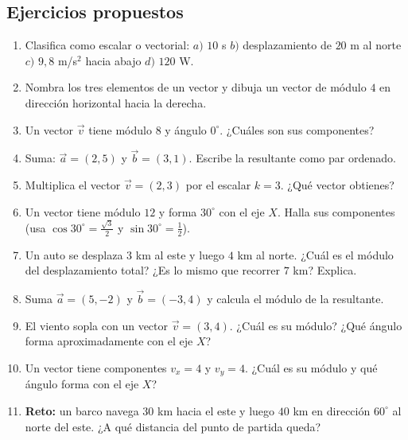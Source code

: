 \documentclass[12pt, letterpaper]{article}
\providecommand{\sen}{\sin}
\begin{document}
\subsection{Ejercicios propuestos}

\begin{enumerate}[leftmargin=*, resume]
  \item \facil{} Clasifica como escalar o vectorial: $a)$ $10$ s \quad $b)$ desplazamiento de $20$ m al norte \quad $c)$ $9{,}8$ m/s$^2$ hacia abajo \quad $d)$ $120$ W.

  \item \facil{} Nombra los tres elementos de un vector y dibuja un vector de módulo $4$ en dirección horizontal hacia la derecha.

  \item \facil{} Un vector $\vec{v}$ tiene módulo $8$ y ángulo $0^{\circ}$. ¿Cuáles son sus componentes?

  \item \facil{} Suma: $\vec{a} = (2, 5)$ y $\vec{b} = (3, 1)$. Escribe la resultante como par ordenado.

  \item \facil{} Multiplica el vector $\vec{v} = (2, 3)$ por el escalar $k = 3$. ¿Qué vector obtienes?

  \item \medio{} Un vector tiene módulo $12$ y forma $30^{\circ}$ con el eje $X$. Halla sus componentes (usa $\cos 30^{\circ} = \tfrac{\sqrt{3}}{2}$ y $\sen 30^{\circ} = \tfrac{1}{2}$).

  \item \medio{} Un auto se desplaza $3$ km al este y luego $4$ km al norte. ¿Cuál es el módulo del desplazamiento total? ¿Es lo mismo que recorrer $7$ km? Explica.

  \item \medio{} Suma $\vec{a} = (5, -2)$ y $\vec{b} = (-3, 4)$ y calcula el módulo de la resultante.

  \item \medio{} El viento sopla con un vector $\vec{v} = (3, 4)$. ¿Cuál es su módulo? ¿Qué ángulo forma aproximadamente con el eje $X$?

  \item \dificil{} Un vector tiene componentes $v_x = 4$ y $v_y = 4$. ¿Cuál es su módulo y qué ángulo forma con el eje $X$?

  \item \dificil{} \textbf{Reto:} un barco navega $30$ km hacia el este y luego $40$ km en dirección $60^{\circ}$ al norte del este. ¿A qué distancia del punto de partida queda?


\end{enumerate}
\end{document}
